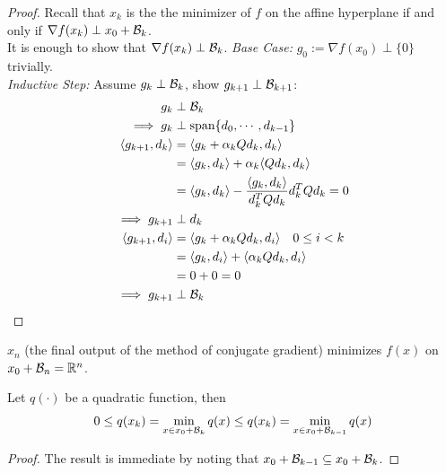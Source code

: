 \documentclass{article}
\begin{document}
	\begin{proof}
		Recall that $x_k$ is the the minimizer of $f$ on the affine hyperplane if and only if $\nabla f(x_k) \perp x_0 + \mathcal{{B}}_k$. \\
		It is enough to show that $\nabla f(x_k) \perp \mathcal{{B}}_k$.
		\emph{Base Case:} $g_0 := \nabla f(x_0) \perp \{0\}$ trivially. \\
		\emph{Inductive Step:} Assume $g_k \perp \mathcal{{B}}_k$, show $g_{k+1} \perp \mathcal{{B}}_{k+1}$:
		\begin{align}
			g_k &\perp \mathcal{{B}}_k \\
			\implies g_k &\perp \text{{span}}\{d_0, \cdots, d_{k-1}\} \\
			\langle {g_{k+1}}, {d_k} \rangle &= \langle {g_{k} + \alpha_k Q d_k}, {d_k} \rangle \\
			&= \langle {g_{k}}, {d_k} \rangle + \alpha_k \langle {Q d_k}, {d_k} \rangle \\
			&= \langle {g_{k}}, {d_k} \rangle - \frac{\langle {g_k}, {d_k} \rangle}{d^T_k Q d_k} d_k^T Q d_k
			= 0 \\
			\implies g_{k+1} &\perp d_k \\
			\langle {g_{k+1}}, {d_i} \rangle &= \langle {g_{k} + \alpha_k Q d_k}, {d_i} \rangle \quad 0 \leq i < k \\
			&= \langle {g_{k}}, {d_i} \rangle + \langle {\alpha_k Q d_k}, {d_i} \rangle \\
			&= 0 + 0 = 0 \\
			\implies g_{k+1} &\perp \mathcal{{B}}_k
		\end{align}
	\end{proof}
	
	\begin{corollary}
		$x_n$ (the final output of the method of conjugate gradient) minimizes $f(x)$ on $x_0 + \mathcal{{B}}_n = \mathbb{R}^n$.
	\end{corollary}
	
	\begin{corollary}
		Let $q(\cdot)$ be a quadratic function, then
		\begin{align}
			0 \leq q(x_k) = \min_{x \in x_0 + \mathcal{{B}}_k} q(x) \leq q(x_k) = \min_{x \in x_0 + \mathcal{{B}}_{k-1}} q(x)
		\end{align}
	\end{corollary}
	
	\begin{proof}
		The result is immediate by noting that $x_0 + \mathcal{{B}}_{k-1} \subseteq x_0 + \mathcal{{B}}_k$.
	\end{proof}
	
\end{document}
